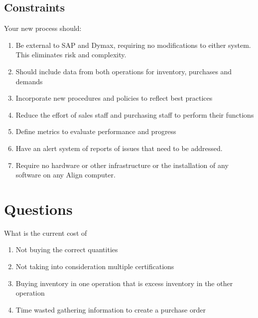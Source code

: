 \documentclass[letterpaper,10pt,english]{sphinxmanual}
\begin{document}
\section{Constraints}
\label{\detokenize{BusinessProcessReengineering:constraints}}
Your new process should:
\begin{enumerate}
%
\item {} 
Be external to SAP and Dymax, requiring no modifications to either
system. This eliminates risk and complexity.

\item {} 
Should include data from both operations for inventory, purchases and
demands

\item {} 
Incorporate new procedures and policies to reflect best practices

\item {} 
Reduce the effort of sales staff and purchasing staff to perform
their functions

\item {} 
Define metrics to evaluate performance and progress

\item {} 
Have an alert system of reports of issues that need to be addressed.

\item {} 
Require no hardware or other infrastructure or the installation of
any software on any Align computer.

\end{enumerate}


\chapter{Questions}
\label{\detokenize{BusinessProcessReengineering:id5}}
What is the current cost of
\begin{enumerate}
%
\item {} 
Not buying the correct quantities

\item {} 
Not taking into consideration multiple certifications

\item {} 
Buying inventory in one operation that is excess inventory in the
other operation

\item {} 
Time wasted gathering information to create a purchase order

\end{enumerate}
\end{document}
